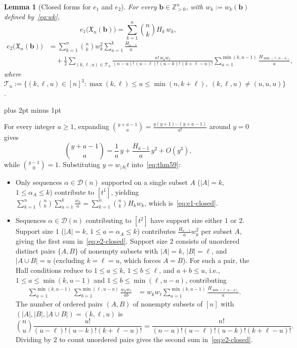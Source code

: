 \documentclass[11pt,letterpaper]{article}
\makeatletter
\renewenvironment{proof}[1][\proofname]{%
  \par\pushQED{\qed}\normalfont
  \topsep9pt plus 2pt minus 1pt\relax
  \trivlist\item[\hskip\labelsep\itshape #1\@addpunct{.}]\ignorespaces
}{\popQED\endtrivlist\@endpefalse}
\theoremstyle{result}
\newtheorem{lemma}[theorem]{Lemma}
\theoremstyle{remark}
\newcommand{\ZZ}{\mathbb{Z}}
\newcommand{\X}{\mathfrak{X}}
\newcommand{\vb}{\mathbf{b}}
\makeatother
\begin{document}
\begin{samepage}
\begin{lemma}[Closed forms for $e_1$ and $e_2$]\label{lem:e1e2}
For every $\vb\in\ZZ_{>0}^n$, with $w_k:=w_k(\vb)$ defined by~\eqref{eq:wk},
\begin{equation}\label{eq:e1-closed}
e_1\bigl(\X_n(\vb)\bigr) = \sum_{k=1}^n \binom{n}{k} H_k\, w_k,
\end{equation}
\begin{equation}\label{eq:e2-closed}
\begin{aligned}
e_2\bigl(\X_n(\vb)\bigr) &= \sum_{k=1}^n \binom{n}{k} w_k^2 \sum_{a=1}^k \frac{H_{a-1}}{a} \\
  &\quad + \frac{1}{2}\sum_{(k,\ell,u)\in\mathcal{T}_n}
    \frac{n!\,w_k w_\ell}{(n-u)!\,(u-\ell)!\,(u-k)!\,(k+\ell-u)!}
    \sum_{a=1}^{\min(k,u-1)}\frac{H_{\min(\ell,u-a)}}{a},
\end{aligned}
\end{equation}
where $\mathcal{T}_n:=\{(k,\ell,u)\in[n]^3 : \max(k,\ell)\le u\le\min(n,k+\ell),\; (k,\ell,u)\neq(u,u,u)\}$.
\end{lemma}
\end{samepage}

\begin{proof}
For every integer $a\ge 1$, expanding $\binom{y+a-1}{a}=\frac{y(y+1)\cdots(y+a-1)}{a!}$ around $y=0$ gives
\[
\binom{y+a-1}{a} = \frac{1}{a}\,y + \frac{H_{a-1}}{a}\,y^2 + O(y^3),
\]
while $\binom{y-1}{0}=1$. Substituting $y=w_{|A|}t$ into~\eqref{eq:thm59}:
\begin{itemize}
\item Only sequences $\alpha\in\mathcal{D}(n)$ supported on a single subset $A$ ($|A|=k$, $1\le \alpha_A\le k$) contribute to $[t^1]$, yielding $\sum_{k=1}^n\binom{n}{k}\sum_{a=1}^k\frac{w_k}{a}=\sum_{k=1}^n\binom{n}{k}H_k w_k$, which is~\eqref{eq:e1-closed}.
\item Sequences $\alpha\in\mathcal{D}(n)$ contributing to $[t^2]$ have support size either $1$ or $2$. Support size $1$ ($|A|=k$, $1\le a=\alpha_A\le k$) contributes $\frac{H_{a-1}}{a}w_k^2$ per subset $A$, giving the first sum in~\eqref{eq:e2-closed}. Support size $2$ consists of unordered distinct pairs $\{A,B\}$ of nonempty subsets with $|A|=k$, $|B|=\ell$, and $|A\cup B|=u$ (excluding $k=\ell=u$, which forces $A=B$). For such a pair, the Hall conditions reduce to $1\le a\le k$, $1\le b\le\ell$, and $a+b\le u$, i.e., $1\le a\le\min(k,u-1)$ and $1\le b\le\min(\ell,u-a)$, contributing
\[
\begin{aligned}
\sum_{a=1}^{\min(k,u-1)}\sum_{b=1}^{\min(\ell,u-a)}\frac{w_k w_\ell}{ab}
  &= w_k w_\ell \sum_{a=1}^{\min(k,u-1)}\frac{H_{\min(\ell,u-a)}}{a}.
\end{aligned}
\]
The number of ordered pairs $(A,B)$ of nonempty subsets of $[n]$ with $(|A|,|B|,|A\cup B|)=(k,\ell,u)$ is
\[
\binom{n}{u}\frac{u!}{(u-\ell)!(u-k)!(k+\ell-u)!}
=\frac{n!}{(n-u)!(u-\ell)!(u-k)!(k+\ell-u)!}.
\]
Dividing by $2$ to count unordered pairs gives the second sum in~\eqref{eq:e2-closed}. \qedhere
\end{itemize}
\end{proof}
\end{document}

